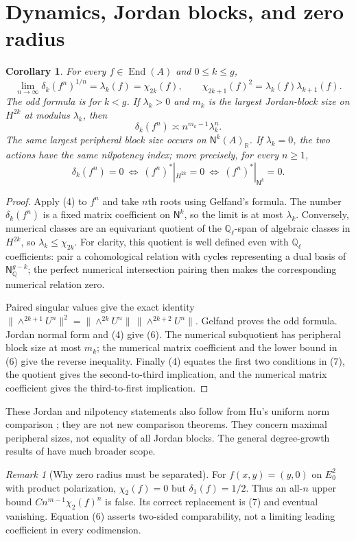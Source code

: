 \documentclass[11pt]{article}
\newtheorem{corollary}[theorem]{Corollary}
\theoremstyle{remark}\newtheorem{remark}[theorem]{Remark}
\newcommand{\End}{\operatorname{End}}
\newcommand{\Q}{\mathbb Q}\newcommand{\R}{\mathbb R}\newcommand{\C}{\mathbb C}
\newcommand{\N}{\mathsf N}
\begin{document}
\section{Dynamics, Jordan blocks, and zero radius}
\begin{corollary}\label{growth}
For every $f\in\End(A)$ and $0\le k\le g$,
\[
 \lim_{n\to\infty}\delta_k(f^n)^{1/n}=\lambda_k(f)=\chi_{2k}(f),
 \qquad \chi_{2k+1}(f)^2=\lambda_k(f)\lambda_{k+1}(f).
 \tag{5}
\]
The odd formula is for $k<g$. If $\lambda_k>0$ and $m_k$ is the largest
Jordan-block size on $H^{2k}$ at modulus $\lambda_k$, then
\[
 \delta_k(f^n)\asymp n^{m_k-1}\lambda_k^n.
 \tag{6}
\]
The same largest peripheral block size occurs on $\N^k(A)_\R$.
If $\lambda_k=0$, the two actions have the same nilpotency index; more
precisely, for every $n\ge1$,
\[
 \delta_k(f^n)=0
 \ \Longleftrightarrow\ (f^n)^*|_{H^{2k}}=0
 \ \Longleftrightarrow\ (f^n)^*|_{\N^k}=0.
 \tag{7}
\]
\end{corollary}
\begin{proof}
Apply (4) to $f^n$ and take $n$th roots using Gelfand's formula.
The number $\delta_k(f^n)$ is a fixed matrix coefficient on $\N^k$,
so the limit is at most $\lambda_k$.
Conversely, numerical classes are an equivariant quotient of the
$\Q_\ell$-span of algebraic classes in $H^{2k}$, so $\lambda_k\le\chi_{2k}$.
For clarity, this quotient is well defined even with $\Q_\ell$
coefficients: pair a cohomological relation with cycles representing
a dual basis of $\N^{g-k}_\Q$; the perfect numerical intersection
pairing then makes the corresponding numerical relation zero.

Paired singular values give the exact identity
$\|\wedge^{2k+1}U^n\|^2=
\|\wedge^{2k}U^n\|\,\|\wedge^{2k+2}U^n\|$.
Gelfand proves the odd formula. Jordan normal form and (4) give (6).
The numerical subquotient has peripheral block size at most $m_k$;
the numerical matrix coefficient and the lower bound in (6) give the
reverse inequality. Finally (4) equates the first two conditions in
(7), the quotient gives the second-to-third implication, and the
numerical matrix coefficient gives the third-to-first implication.
\end{proof}
These Jordan and nilpotency statements also follow from Hu's uniform
norm comparison \cite[Corollary 5.6]{Hu}; they are not new comparison
theorems. They concern maximal peripheral sizes, not equality of all
Jordan blocks. The general degree-growth results of \cite{HJ} have
much broader scope.

\begin{remark}[Why zero radius must be separated]
For $f(x,y)=(y,0)$ on $E_0^2$ with product polarization,
$\chi_2(f)=0$ but $\delta_1(f)=1/2$. Thus an all-$n$ upper bound
$Cn^{m-1}\chi_2(f)^n$ is false. Its correct replacement is (7) and
eventual vanishing. Equation (6) asserts two-sided comparability,
not a limiting leading coefficient in every codimension.
\end{remark}
\end{document}
